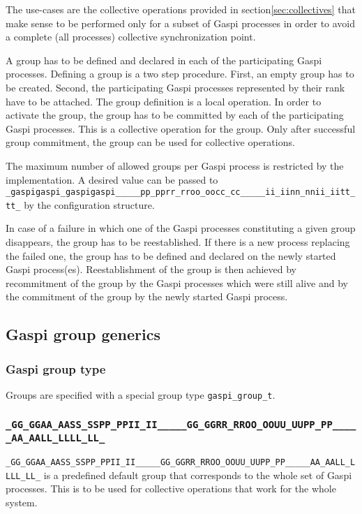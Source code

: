 \documentclass{article}
\makeatletter
\newcommand{\secref}[1]{section\xspace\ref{#1}}
\newlength{\st}\setlength{\st}{0pt}
\newcommand{\zerowsep}{\hskip 0pt plus 0.1pt minus 0.1pt}
\newcommand{\ZSEP}[1]{\ifx#1\@@@EOZ@@@\let\next\relax\else\ifx#1\_#1\zerowsep\else#1\fi\let\next\ZSEP\fi\next}
\newcommand{\zsep}[1]{\ZSEP{}#1\@@@EOZ@@@}
\newcommand{\gaspiprefix}{gaspi}
\newcommand{\GASPI}{{\sc Gaspi}}
\newcommand{\function}[1]{{\tt #1}}
\newcommand{\gaspifunction}[1]{\function{\protect\zsep{\gaspiprefix\_#1}}}
\newcommand{\GASPIGROUPALL}{{\tt\protect\zsep{GASPI\_GROUP\_ALL}}}
\makeatother
\begin{document}
The use-cases are the collective operations provided in \secref{sec:collectives}
that make sense to be performed only for a subset of \GASPI{} processes
in order to avoid a complete (all processes) collective synchronization
point.

A group has to be defined and declared in each of the participating
\GASPI{} processes. Defining a group is a two step procedure. First,
an empty group has to be created. Second, the participating \GASPI{}
processes represented by their rank have to be attached. The group
definition is a local operation.  In order to activate the group, the
group has to be committed by each of the participating \GASPI{}
processes. This is a collective operation for the group. Only after
successful group commitment, the group can be used for collective
operations.

The maximum number of allowed groups per \GASPI{} process is restricted by the
implementation. A desired value can be passed to \gaspifunction{proc\_init} by
the configuration structure.

In case of a failure in which one of the \GASPI{} processes
constituting a given group disappears, the group has to be
reestablished. If there is a new process replacing the failed one, the
group has to be defined and declared on the newly started \GASPI{}
process(es).  Reestablishment of the group is then achieved by
recommitment of the group by the \GASPI{} processes which were still
alive and by the commitment of the group by the newly started \GASPI{}
process.

\subsection{\GASPI{} group generics}

\subsubsection{\GASPI{} group type}

Groups are specified with a special group type \verb|gaspi_group_t|.

\subsubsection{\GASPIGROUPALL{}}

\GASPIGROUPALL{} is a predefined default group that corresponds
to the whole set of \GASPI{} processes. This is to be used for collective
operations that work for the whole system.
\end{document}
